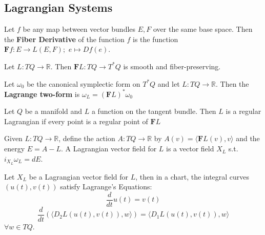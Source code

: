 \subsection{Lagrangian Systems}

\begin{defn}

Let $f$ be any map between vector bundles $E,F$ over the same base space. Then the \textbf{Fiber Derivative} of the function $f$ is the function $\textbf{F}f:E \to L(E,F); \hspace{4pt} e \mapsto Df(e)$.

\end{defn}

\begin{prop}

Let $L: TQ \to \mathbb{R}$. Then $\textbf{F}L:TQ \to T^*Q$ is smooth and fiber-preserving.

\end{prop}

\begin{defn}

Let $\omega_0$ be the canonical symplectic form on $T^*Q$ and let $L: TQ \to \mathbb{R}$. Then the \textbf{Lagrange two-form} is $\omega_L = (\textbf{F}L)^* \omega_0$

\end{defn}

\begin{defn}

Let $Q$ be a manifold and $L$ a function on the tangent bundle. Then $L$ is a regular Lagrangian if every point is a regular point of $\textbf{F}L$

\end{defn}

\begin{defn}

Given $L:TQ \to \mathbb{R}$, define the action $A: TQ \to \mathbb{R}$ by $A(v) = \langle \textbf{F}L(v), v\rangle $ and the energy $E = A - L$. A Lagrangian vector field for $L$ is a vector field $X_L$ s.t. $i_{X_L} \omega_L = dE$.

\end{defn}

\begin{thm}

Let $X_L$ be a  Lagrangian vector field for $L$, then in a chart, the integral curves $(u(t), v(t))$ satisfy Lagrange's Equations:
\[\frac{d}{dt}u(t) = v(t)\]
\[\frac{d}{dt}\left( \langle D_2 L(u(t),v(t)), w\rangle  \right) = \langle D_1 L(u(t),v(t)),w\rangle \]
$\forall w \in TQ$.

\end{thm}

